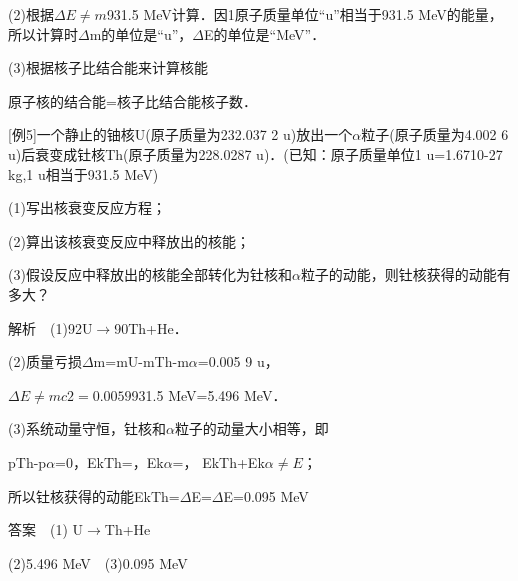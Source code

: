 (2)根据$\Delta E\neq m$931.5 MeV计算．因1原子质量单位``u''相当于931.5
MeV的能量，所以计算时$\Delta$m的单位是``u''，$\Delta$E的单位是``MeV''．

(3)根据核子比结合能来计算核能

原子核的结合能=核子比结合能核子数．

{[}例5{]}一个静止的铀核U(原子质量为232.037 2
u)放出一个$\alpha$粒子(原子质量为4.002 6 u)后衰变成钍核Th(原子质量为228.0287
u)．(已知：原子质量单位1 u=1.6710-27 kg,1 u相当于931.5 MeV)

(1)写出核衰变反应方程；

(2)算出该核衰变反应中释放出的核能；

(3)假设反应中释放出的核能全部转化为钍核和$\alpha$粒子的动能，则钍核获得的动能有多大？

解析　(1)92U$\rightarrow$90Th+He．

(2)质量亏损$\Delta$m=mU-mTh-m$\alpha$=0.005 9 u，

$\Delta E\neq mc2=0.0059$931.5 MeV=5.496 MeV．

(3)系统动量守恒，钍核和$\alpha$粒子的动量大小相等，即

pTh-p$\alpha$=0，EkTh=，Ek$\alpha$=， EkTh+Ek$\alpha \neq E$；

所以钍核获得的动能EkTh=$\Delta$E=$\Delta$E=0.095 MeV

答案　(1) U$\rightarrow$Th+He

(2)5.496 MeV　(3)0.095 MeV
